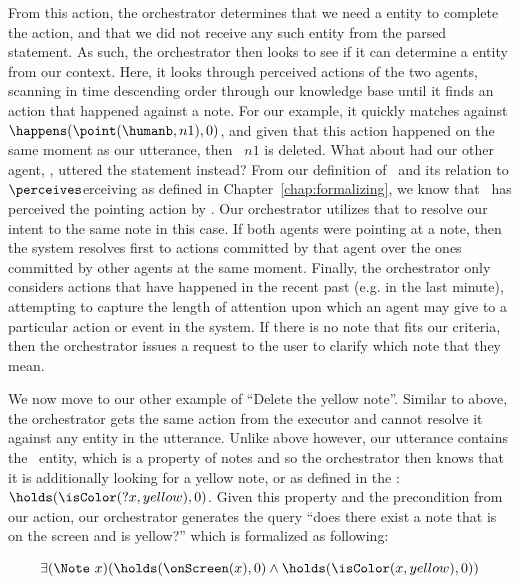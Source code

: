From this action, the orchestrator determines that we need a \Note entity to complete the
action, and that we did not receive any such entity from the parsed statement. As such,
the orchestrator then looks to see if it can determine a \Note entity from our context. Here,
it looks through perceived actions of the two agents, scanning in time descending order through
our knowledge base until it finds an action that happened against a note. For our example, it
quickly matches against $\happens(\point(\humanb, n1), 0)$, and given that this action happened
on the same moment as our utterance, then \Note\ $n1$ is deleted. What about had our other agent,
\humana, uttered the statement instead? From our definition of \vicinity\ and its relation to $\perceives$erceiving
as defined in Chapter~\ref{chap:formalizing}, we know that \humana\ has perceived the pointing action
by \humanb. Our orchestrator utilizes that to resolve our intent to the same note in this case.
If both agents were pointing at a note, then the system resolves first to actions committed by that
agent over the ones committed by other agents at the same moment. Finally, the orchestrator
only considers actions that have happened in the recent past (e.g. in the last minute), attempting
to capture the length of attention upon which an agent may give to a particular action or event in
the system. If there is no note that fits our criteria, then the orchestrator issues a request
to the user to clarify which note that they mean.

We now move to our other example of ``Delete the yellow note''. Similar to above, the orchestrator
gets the same action from the executor and cannot resolve it against any entity in the utterance.
Unlike above however, our utterance contains the \Color\ entity, which is a property of notes and so the
orchestrator then knows that it is additionally looking for a yellow note, or as defined in the
\CEC: $\holds(\isColor(?x, yellow), 0)$. Given this property and the precondition from our action,
our orchestrator generates the query ``does there exist a note that is on the screen and is
yellow?'' which is formalized as following:

\begin{equation*}
    \exists (\Note\ x) (\holds(\onScreen(x), 0) \land \holds(\isColor(x, yellow), 0))
\end{equation*}

